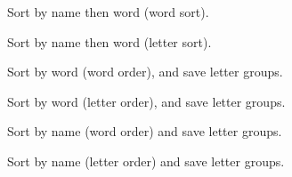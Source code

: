 \documentclass[english]{article}
\begin{document}
Sort by name then word (word sort).


\newpage
Sort by name then word (letter sort).


\newpage
Sort by word (word order), and save letter groups.


\newpage
Sort by word (letter order), and save letter groups.


\newpage
Sort by name (word order) and save letter groups.


\newpage
Sort by name (letter order) and save letter groups.

\end{document}
